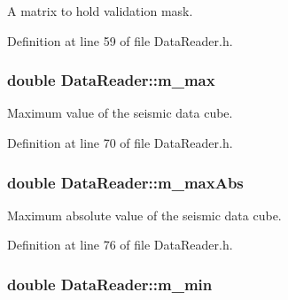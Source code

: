 A matrix to hold validation mask. 



Definition at line 59 of file Data\+Reader.\+h.

\subsubsection[{\texorpdfstring{m\+\_\+max}{m_max}}]{\setlength{\rightskip}{0pt plus 5cm}double Data\+Reader\+::m\+\_\+max\hspace{0.3cm}{\ttfamily [private]}}\hypertarget{classDataReader_ad2afd61ea40bdaa3d6678adc1548a057}{}\label{classDataReader_ad2afd61ea40bdaa3d6678adc1548a057}


Maximum value of the seismic data cube. 



Definition at line 70 of file Data\+Reader.\+h.

\subsubsection[{\texorpdfstring{m\+\_\+max\+Abs}{m_maxAbs}}]{\setlength{\rightskip}{0pt plus 5cm}double Data\+Reader\+::m\+\_\+max\+Abs\hspace{0.3cm}{\ttfamily [private]}}\hypertarget{classDataReader_a9a9066f2dafe278b3acd45e84cc2126e}{}\label{classDataReader_a9a9066f2dafe278b3acd45e84cc2126e}


Maximum absolute value of the seismic data cube. 



Definition at line 76 of file Data\+Reader.\+h.

\subsubsection[{\texorpdfstring{m\+\_\+min}{m_min}}]{\setlength{\rightskip}{0pt plus 5cm}double Data\+Reader\+::m\+\_\+min\hspace{0.3cm}{\ttfamily [private]}}\hypertarget{classDataReader_aba740a2b8be42c25449e1c91e0e03805}{}\label{classDataReader_aba740a2b8be42c25449e1c91e0e03805}


